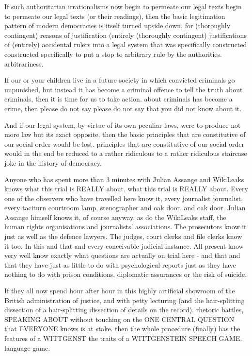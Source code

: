 \begin{multicols}{2}
If such authoritarian irrationalisms now begin to permeate our legal texts
begin to permeate our legal texts (or their readings), then the basic legitimation pattern of modern democracies is itself turned upside down,
for (thoroughly contingent) reasons of justification (entirely
(thoroughly contingent) justifications of (entirely) accidental rulers into a legal system that was specifically constructed
constructed specifically to put a stop to arbitrary rule by the authorities.
arbitrariness.

If our or your children live in a future society in which convicted criminals go unpunished, but instead it has become a criminal offence to tell the truth about criminals, then it is time for us to take action.
about criminals has become a crime, then please do not say
please do not say that you did not know about it.

And if our legal system, by virtue of its own peculiar laws, were to produce not more law but its exact opposite, then the basic principles that are constitutive of our social order would be lost.
principles that are constitutive of our social order would in the end be reduced to a rather ridiculous
to a rather ridiculous staircase joke in the history of democracy.

Anyone who has spent more than 3 minutes with Julian
Assange and WikiLeaks knows what this trial is REALLY about.
what this trial is REALLY about. Every one of the
observers who have travelled here know it, every journalist
journalist, every taciturn courtroom lamp, stenographer and oak door.
and oak door. Julian Assange himself knows it, of course
anyway, as do the WikiLeaks staff, the human rights organisations and journalists' associations.
The prosecutors know it just as well as the defence lawyers.
The judges, court clerks and file clerks know it too. In this and that and every conceivable judicial instance. All present know very well
know exactly what questions are actually on trial here - and that
and that they have just as little to do with psychological reports
just as they have nothing to do with prison conditions,
diplomatic assurances or the risk of suicide.

If they all now spend hour after hour in this highly artificial showroom of the British administration of justice, and with petty lecturing (and the hair-splitting dissection of a
hair-splitting dissection of details on the record).
rhetoric battles, SPEAKING ABOUT
without touching on the ONE CENTRAL QUESTION that EVERYONE knows is at stake.
then the whole procedure (finally) has the features of a WITTGENST
the traits of a WITTGENSTEIN SPEECH GAME.
language game.


\end{multicols}
